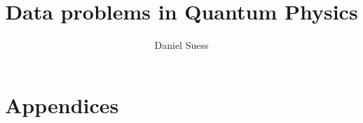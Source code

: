 \documentclass[a4paper,11pt,BCOR=8mm,twoside,headsepline]{scrbook}
\author{Daniel Suess}
\title{Data problems in Quantum Physics}
\begin{document}
\frontmatter
\maketitle
\tableofcontents
\newpage
\makeatletter
\providecommand\@dotsep{5}
\makeatother
\listoftodos\relax
\newpage

\mainmatter






\appendix
\chapter{Appendices}


\printbibliography
\end{document}
